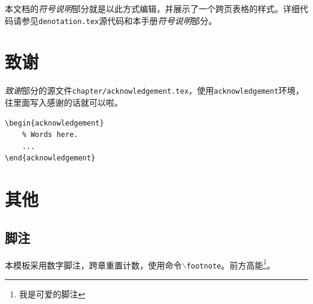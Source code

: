     本文档的\emph{符号说明}部分就是以此方式编辑，并展示了一个跨页表格的样式。详细代码请参见\texttt{denotation.tex}源代码和本手册\emph{符号说明}部分。

\section{致谢}
    \emph{致谢}部分的源文件\texttt{chapter/acknowledgement.tex}，使用\texttt{acknowledgement}环境，往里面写入感谢的话就可以啦。
    \begin{lstlisting}
\begin{acknowledgement}
    % Words here.
    ...
\end{acknowledgement}
    \end{lstlisting}

\section{其他}\label{sec:other}

    \subsection{脚注}
    本模板采用数字脚注，跨章重置计数，使用命令\texttt{$\backslash$footnote}。前方高能\footnote{我是可爱的脚注}。

